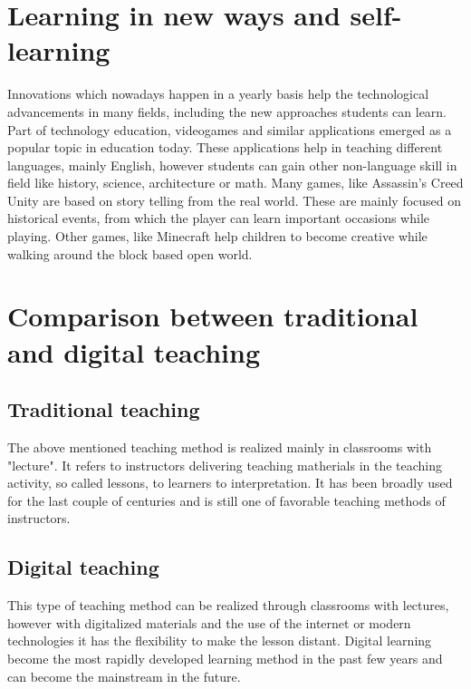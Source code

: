 \documentclass[10pt,oneside,english,a4paper]{article}
\begin{document}
\section{Learning in new ways and self-learning}\label{self-learning}

	Innovations which nowadays happen in a yearly basis  help the technological advancements in many fields, including the new approaches students can learn. Part of technology education, videogames and similar applications emerged as a popular topic
in education today\cite{Okur2017}. These applications help in teaching different languages, mainly English, however students can gain other non-language skill in field like history, science, architecture or math. Many games, like Assassin's Creed Unity are based on story telling from the real world. These are mainly focused on historical events, from which the player can learn important occasions while playing. Other games, like Minecraft help children to become creative while walking around the block based open world. 

\section{Comparison between traditional and digital teaching}\label{comparison}

\subsection{Traditional teaching}

	The above mentioned teaching method is realized mainly in classrooms with "lecture". It refers to instructors delivering teaching matherials in the teaching activity, so called lessons, to learners to interpretation. It has been broadly used for the last couple of centuries and is still one of favorable teaching methods of instructors.\cite{Lin2017}

\subsection{Digital teaching}

	This type of teaching method can be realized through classrooms with lectures, however with digitalized materials and the use of the internet or modern technologies it has the flexibility to make the lesson distant. Digital learning become the most rapidly developed learning method in the past few years and can become the mainstream in the future.\cite{Lin2017}
\end{document}
